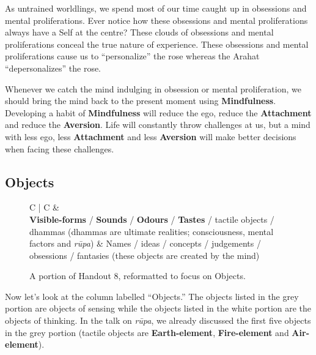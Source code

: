 As untrained worldlings, we spend most of our time caught up in obsessions and mental proliferations. Ever notice how these obsessions and mental proliferations always have a Self at the centre? These clouds of obsessions and mental proliferations conceal the true nature of experience. These obsessions and mental proliferations cause us to “personalize” the rose whereas the Arahat “depersonalizes” the rose.

Whenever we catch the mind indulging in obsession or mental proliferation, we should bring the mind back to the present moment using \textbf{Mindfulness}. Developing a habit of \textbf{Mindfulness} will reduce the ego, reduce the \textbf{Attachment} and reduce the \textbf{Aversion}. Life will constantly throw challenges at us, but a mind with less ego, less \textbf{Attachment} and less \textbf{Aversion} will make better decisions when facing these challenges.

\subsection*{Objects}

\begin{figure}[H]
\begin{tabular*}{\textwidth}{C{\tabcolsep} | C{\tabcolsep}}
\toprule
{} &  \\
\midrule
\textbf{Visible-forms} / \textbf{Sounds} / \textbf{Odours} / \textbf{Tastes} / tactile objects / dhammas\newline
  (dhammas are ultimate realities; consciousness, mental factors and \textit{rūpa})
  &
  Names / ideas / concepts / judgements / obsessions / fantasies\newline
    (these objects are created by the mind)
  \\
  
\bottomrule
\end{tabular*}
\caption{A portion of Handout 8, reformatted to focus on Objects.}
\end{figure}

Now let’s look at the column labelled “Objects.” The objects listed in the grey portion are objects of sensing while the objects listed in the white portion are the objects of thinking. In the talk on \textit{rūpa}, we already discussed the first five objects in the grey portion (tactile objects are \textbf{Earth-element}, \textbf{Fire-element} and \textbf{Air-element}).

